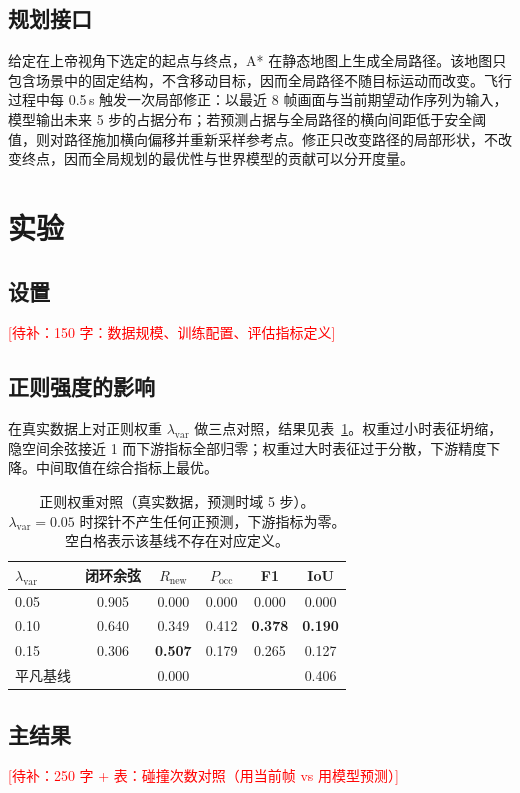 \documentclass[12pt,a4paper]{ctexart}
\newcommand{\todo}[1]{\textcolor{red}{[待补：#1]}}
\begin{document}
\subsection{规划接口}
给定在上帝视角下选定的起点与终点，A* 在静态地图上生成全局路径。该地图只包含场景中的固定结构，不含移动目标，因而全局路径不随目标运动而改变。飞行过程中每 0.5\,s 触发一次局部修正：以最近 8 帧画面与当前期望动作序列为输入，模型输出未来 5 步的占据分布；若预测占据与全局路径的横向间距低于安全阈值，则对路径施加横向偏移并重新采样参考点。修正只改变路径的局部形状，不改变终点，因而全局规划的最优性与世界模型的贡献可以分开度量。

\section{实验}

\subsection{设置}
\todo{150 字：数据规模、训练配置、评估指标定义}

\subsection{正则强度的影响}
在真实数据上对正则权重 $\lambda_{\text{var}}$ 做三点对照，结果见表~\ref{tab:lambda}。权重过小时表征坍缩，隐空间余弦接近 1 而下游指标全部归零；权重过大时表征过于分散，下游精度下降。中间取值在综合指标上最优。

\begin{table}[H]
\centering
\caption{正则权重对照（真实数据，预测时域 5 步）。$\lambda_{\text{var}}=0.05$ 时探针不产生任何正预测，下游指标为零。空白格表示该基线不存在对应定义。}
\label{tab:lambda}
\begin{tabular}{lccccc}
\toprule
$\lambda_{\text{var}}$ & 闭环余弦 & $R_{\text{new}}$ & $P_{\text{occ}}$ & F1 & IoU \\
\midrule
0.05 & 0.905 & 0.000 & 0.000 & 0.000 & 0.000 \\
0.10 & 0.640 & 0.349 & 0.412 & \textbf{0.378} & \textbf{0.190} \\
0.15 & 0.306 & \textbf{0.507} & 0.179 & 0.265 & 0.127 \\
\midrule
平凡基线 &              & 0.000 &              &              & 0.406 \\
\bottomrule
\end{tabular}
\end{table}

\subsection{主结果}
\todo{250 字 + 表：碰撞次数对照（用当前帧 vs 用模型预测）}
\end{document}

